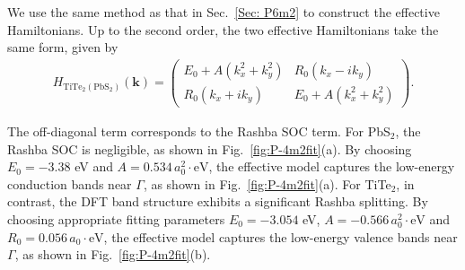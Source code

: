\documentclass[aps, preprint, prb,]{revtex4-2}
\begin{document}
We use the same method as that in Sec.~\ref{Sec: P6m2} to construct the effective Hamiltonians. Up to the second order, the two effective Hamiltonians take the same form, given by 
\begin{eqnarray}
H_{\mathrm{TiTe}_2(\mathrm{PbS}_2)}(\mathbf{k})=
\begin{pmatrix}
E_0+A(k_x^2+k_y^2) & R_0(k_x-i k_y)\\
R_0(k_x+i k_y) & E_0+A(k_x^2+k_y^2)
\end{pmatrix}.    
\end{eqnarray}

The off-diagonal term corresponds to the Rashba SOC term. For PbS$_2$, the Rashba SOC is negligible, as shown in Fig.~\ref{fig:P-4m2fit}(a). By choosing $E_0=-3.38$ eV and $A=0.534\,a_0^2\cdot\mathrm{eV}$, the effective model captures the low-energy conduction bands near $\Gamma$, as shown in Fig.~\ref{fig:P-4m2fit}(a). For TiTe$_2$, in contrast, the DFT band structure exhibits a significant Rashba splitting. By choosing appropriate fitting parameters $E_0=-3.054$ eV, $A=-0.566\,a_0^2\cdot\mathrm{eV}$ and $R_0=0.056\,a_0\cdot\mathrm{eV}$, the effective model captures the low-energy valence bands near $\Gamma$, as shown in Fig.~\ref{fig:P-4m2fit}(b).
\end{document}
